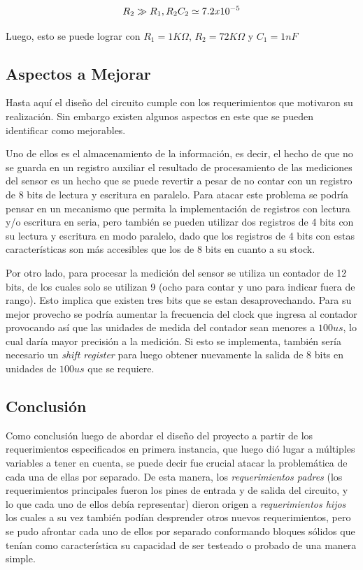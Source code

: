 \[
    R_{2}\gg R_{1},\\
    R_{2}C_{2}\simeq7.2x10^{-5}
\]

Luego, esto se puede lograr con $R_{1}=1K\varOmega$, $R_{2}=72K\varOmega$
y $C_{1}=1nF$

\subsection{Aspectos a Mejorar}

Hasta aquí el diseño del circuito cumple con los requerimientos que
motivaron su realización. Sin embargo existen algunos aspectos en
este que se pueden identificar como mejorables.

Uno de ellos es el almacenamiento de la información, es decir, el
hecho de que no se guarda en un registro auxiliar el resultado de
procesamiento de las mediciones del sensor es un hecho que se puede
revertir a pesar de no contar con un registro de 8 bits de lectura
y escritura en paralelo. Para atacar este problema se podría pensar
en un mecanismo que permita la implementación de registros con lectura
y/o escritura en seria, pero también se pueden utilizar dos registros
de 4 bits con su lectura y escritura en modo paralelo, dado que los
registros de 4 bits con estas características son más accesibles que
los de 8 bits en cuanto a su stock.

Por otro lado, para procesar la medición del sensor se utiliza un
contador de 12 bits, de los cuales solo se utilizan 9 (ocho para contar
y uno para indicar fuera de rango). Esto implica que existen tres
bits que se estan desaprovechando. Para su mejor provecho se podría
aumentar la frecuencia del clock que ingresa al contador provocando
así que las unidades de medida del contador sean menores a $100us$,
lo cual daría mayor precisión a la medición. Si esto se implementa,
también sería necesario un \textit{shift register} para luego obtener
nuevamente la salida de 8 bits en unidades de $100us$ que se requiere.

\subsection{Conclusión}

Como conclusión luego de abordar el diseño del proyecto a partir de
los requerimientos especificados en primera instancia, que luego dió
lugar a múltiples variables a tener en cuenta, se puede decir fue
crucial atacar la problemática de cada una de ellas por separado.
De esta manera, los \textit{requerimientos padres} (los requerimientos
principales fueron los pines de entrada y de salida del circuito,
y lo que cada uno de ellos debía representar) dieron origen a \textit{requerimientos
hijos} los cuales a su vez también podían desprender otros nuevos
requerimientos, pero se pudo afrontar cada uno de ellos por separado
conformando bloques sólidos que tenían como característica su capacidad
de ser testeado o probado de una manera simple.


